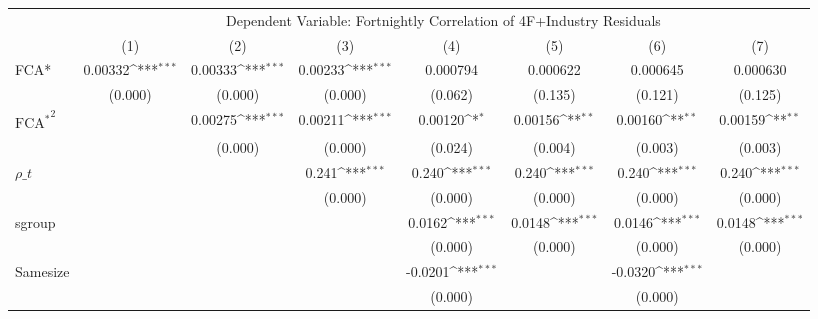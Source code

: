 {
\def\sym#1{\ifmmode^{#1}\else\(^{#1}\)\fi}
\begin{tabular}{l*{7}{c}}
\hline\hline 
& \multicolumn{7}{c}{Dependent Variable: Fortnightly Correlation of 4F+Industry Residuals}                 \\
 \cline{2-8}
                    &\multicolumn{1}{c}{(1)}         &\multicolumn{1}{c}{(2)}         &\multicolumn{1}{c}{(3)}         &\multicolumn{1}{c}{(4)}         &\multicolumn{1}{c}{(5)}         &\multicolumn{1}{c}{(6)}         &\multicolumn{1}{c}{(7)}         \\
\hline
FCA*          &     0.00332\sym{***}&     0.00333\sym{***}&     0.00233\sym{***}&    0.000794         &    0.000622         &    0.000645         &    0.000630         \\
                    &     (0.000)         &     (0.000)         &     (0.000)         &     (0.062)         &     (0.135)         &     (0.121)         &     (0.125)         \\
[1em]
 $ { \text{FCA} ^ * } ^2 $&                     &     0.00275\sym{***}&     0.00211\sym{***}&     0.00120\sym{*}  &     0.00156\sym{**} &     0.00160\sym{**} &     0.00159\sym{**} \\
                    &                     &     (0.000)         &     (0.000)         &     (0.024)         &     (0.004)         &     (0.003)         &     (0.003)         \\
[1em]
$ \rho\_t $          &                     &                     &       0.241\sym{***}&       0.240\sym{***}&       0.240\sym{***}&       0.240\sym{***}&       0.240\sym{***}\\
                    &                     &                     &     (0.000)         &     (0.000)         &     (0.000)         &     (0.000)         &     (0.000)         \\
[1em]
sgroup              &                     &                     &                     &      0.0162\sym{***}&      0.0148\sym{***}&      0.0146\sym{***}&      0.0148\sym{***}\\
                    &                     &                     &                     &     (0.000)         &     (0.000)         &     (0.000)         &     (0.000)         \\
[1em]
Samesize            &                     &                     &                     &     -0.0201\sym{***}&                     &     -0.0320\sym{***}&                     \\
                    &                     &                     &                     &     (0.000)         &                     &     (0.000)         &                     \\

\end{tabular}}
